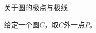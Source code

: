 





\begin{definition}{关于圆的极点与极线}

给定一个圆$C$，取$C$外一点$P$。

\end{definition}



























